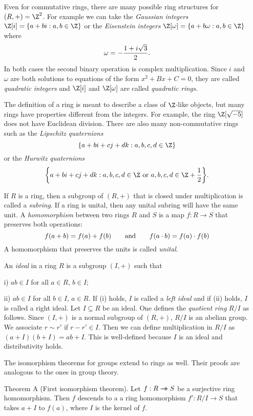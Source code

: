 Even for commutative rings, there are many possible ring structures for $(R,+) = \Z^2$. For example we can take the {\it Gaussian integers} $\Z[i] = \{a+bi : a,b\in\Z\}$ or the {\it Eisenstein integers} $\Z[\omega] = \{a + b\omega : a,b\in \Z\}$ where
$$\omega = -{1 + i\sqrt{3} \over 2}.$$
In both cases the second binary operation is complex multiplication. Since $i$ and $\omega$ are both solutions to equations of the form $x^2 + Bx + C = 0$, they are called {\it quadratic integers} and $\Z[i]$ and $\Z[\omega]$ are called {\it quadratic rings}.

The definition of a ring is meant to describe a class of $\Z$-like objects, but many rings have properties different from the integers. For example, the ring $\Z[\sqrt{-5}]$ does not have Euclidean division. There are also many non-commutative rings such as the {\it Lipschitz quaternions}
$$\{a + bi + cj + dk : a,b,c,d\in \Z\}$$
or the {\it Hurwitz quaternions}
$$\bigg\{a + bi + cj + dk : a,b,c,d\in \Z\ \hbox{or}\ a,b,c,d\in \Z + {1\over 2}\bigg\}.$$

If $R$ is a ring, then a subgroup of $(R,+)$ that is closed under multiplication is called a {\it subring}. If a ring is unital, then any unital subring will have the same unit. A {\it homomorphism} between two rings $R$ and $S$ is a map $f:R\to S$ that preserves both operations:
$$f(a+b) = f(a) + f(b) \qquad\hbox{and}\qquad f(a\cdot b) = f(a)\cdot f(b)$$
A homomorphism that preserves the units is called {\it unital}.

An {\it ideal} in a ring $R$ is a subgroup $(I,+)$ such that
\medskip
\item{i)} $ab\in I$ for all $a\in R$, $b\in I$;
\smallskip
\item{ii)} $ab\in I$ for all $b\in I$, $a\in R$.
\medskip
If (i) holds, $I$ is called a {\it left ideal} and if (ii) holds, $I$ is called a right ideal. Let $I \subseteq R$ be an ideal. One defines the {\it quotient ring} $R/I$ as follows. Since $(I,+)$ is a normal subgroup of $(R,+)$, $R/I$ is an abelian group. We associate $r\sim r'$ if $r-r'\in I$. Then we can define multiplication in $R/I$ as $(a+I)(b+I) = ab+I$. This is well-defined because $I$ is an ideal and distributivity holds.

The isomorphism theorems for groups extend to rings as well. Their proofs are analogous to the ones in group theory.

\parenproclaim Theorem A (First isomorphism theorem). Let $f:R\rightarrow\!\!\!\!\!\rightarrow S$ be a surjective ring homomorphism. Then $f$ descends to a a ring homomorphism $f' : R/I \to S$ that takes $a+I$ to $f(a)$, where $I$ is the kernel of $f$.\slug

